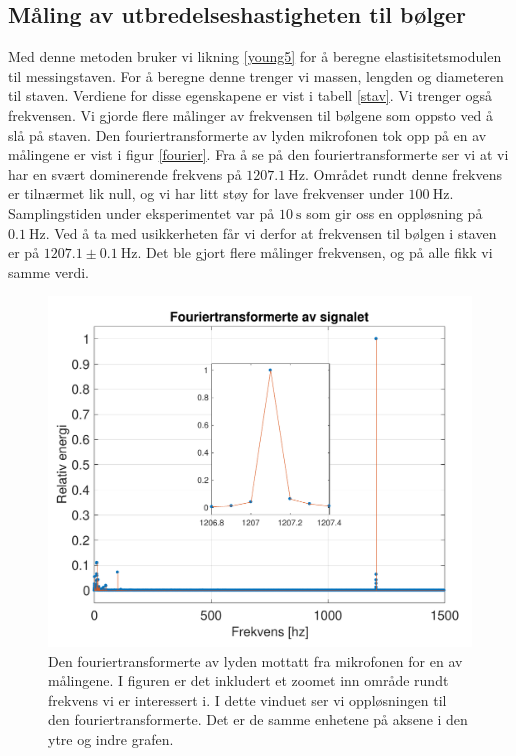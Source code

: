 \documentclass[%
 reprint,
 amsmath,amssymb,
 aps,
 norsk,
 booktabs
]{revtex4-1}
\begin{document}
\subsection{Måling av utbredelseshastigheten til bølger}
Med denne metoden bruker vi likning \eqref{young5} for å beregne elastisitetsmodulen til messingstaven. For å beregne denne trenger vi massen, lengden og diameteren til staven. Verdiene for disse egenskapene er vist i tabell \vref{stav}. Vi trenger også frekvensen. Vi gjorde flere målinger av frekvensen til bølgene som oppsto ved å slå på staven. Den fouriertransformerte av lyden mikrofonen tok opp på en av målingene er vist i figur \vref{fourier}. Fra å se på den fouriertransformerte ser vi at vi har en svært dominerende frekvens på $\SI{1207.1}{\hertz}$. Området rundt denne frekvens er tilnærmet lik null, og vi har litt støy for lave frekvenser under $\SI{100}{\hertz}$. Samplingstiden under eksperimentet var på $\SI{10}{\second}$ som gir oss en oppløsning på $\SI{0.1}{\hertz}$. Ved å ta med usikkerheten får vi derfor at frekvensen til bølgen i staven er på $1207.1\pm\SI{0.1}{\hertz}$. Det ble gjort flere målinger frekvensen, og på alle fikk vi samme verdi.
\begin{figure}[h!]
  \centering
  \includegraphics[scale=0.46]{fourier_c.pdf}
  \caption{Den fouriertransformerte av lyden mottatt fra mikrofonen for en av målingene. I figuren er det inkludert et zoomet inn område rundt frekvens vi er interessert i. I dette vinduet ser vi oppløsningen til den fouriertransformerte. Det er de samme enhetene på aksene i den ytre og indre grafen.}
  \label{fourier}
\end{figure}
\end{document}
